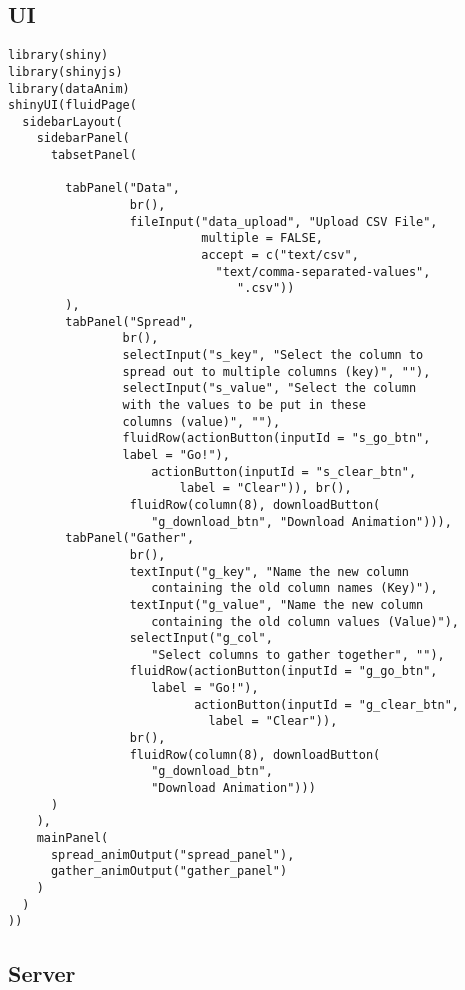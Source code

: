 \subsection{UI}

\begin{lstlisting}
library(shiny)
library(shinyjs)
library(dataAnim)
shinyUI(fluidPage(
  sidebarLayout(
    sidebarPanel(
      tabsetPanel(
        
        tabPanel("Data", 
                 br(),
                 fileInput("data_upload", "Upload CSV File",
                           multiple = FALSE,
                           accept = c("text/csv",
                             "text/comma-separated-values",
                                ".csv"))
        ),
        tabPanel("Spread", 
                br(),
                selectInput("s_key", "Select the column to 
                spread out to multiple columns (key)", ""),
                selectInput("s_value", "Select the column 
                with the values to be put in these 
                columns (value)", ""),
                fluidRow(actionButton(inputId = "s_go_btn", 
                label = "Go!"),
                    actionButton(inputId = "s_clear_btn", 
                        label = "Clear")), br(),
                 fluidRow(column(8), downloadButton(
                    "g_download_btn", "Download Animation"))),
        tabPanel("Gather",
                 br(),
                 textInput("g_key", "Name the new column 
                    containing the old column names (Key)"),
                 textInput("g_value", "Name the new column 
                    containing the old column values (Value)"),
                 selectInput("g_col", 
                    "Select columns to gather together", ""),
                 fluidRow(actionButton(inputId = "g_go_btn", 
                    label = "Go!"),
                          actionButton(inputId = "g_clear_btn", 
                            label = "Clear")),
                 br(),
                 fluidRow(column(8), downloadButton(
                    "g_download_btn", 
                    "Download Animation")))
      )
    ),
    mainPanel(
      spread_animOutput("spread_panel"),
      gather_animOutput("gather_panel")
    )
  )
))

\end{lstlisting}

\subsection{Server}


